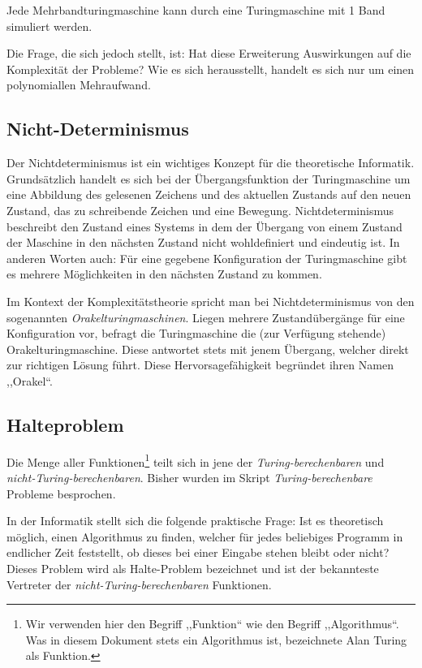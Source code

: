 Jede Mehrbandturingmaschine kann durch eine Turingmaschine mit 1 Band simuliert werden.

Die Frage, die sich jedoch stellt, ist: Hat diese Erweiterung Auswirkungen auf die Komplexität der Probleme? Wie es sich herausstellt, handelt es sich nur um einen polynomiallen Mehraufwand.
%
\subsection{Nicht-Determinismus}
\label{sec:nondeterminism}
%
Der Nichtdeterminismus ist ein wichtiges Konzept für die theoretische Informatik. Grundsätzlich handelt es sich bei der Übergangsfunktion der Turingmaschine um eine Abbildung des gelesenen Zeichens und des aktuellen Zustands auf den neuen Zustand, das zu schreibende Zeichen und eine Bewegung. Nichtdeterminismus beschreibt den Zustand eines Systems in dem der Übergang von einem Zustand der Maschine in den nächsten Zustand nicht wohldefiniert und eindeutig ist. In anderen Worten auch: Für eine gegebene Konfiguration der Turingmaschine gibt es mehrere Möglichkeiten in den nächsten Zustand zu kommen.

Im Kontext der Komplexitätstheorie spricht man bei Nichtdeterminismus von den sogenannten \emph{Orakelturingmaschinen}. Liegen mehrere Zustandübergänge für eine Konfiguration vor, befragt die Turingmaschine die (zur Verfügung stehende) Orakelturingmaschine. Diese antwortet stets mit jenem Übergang, welcher direkt zur richtigen Lösung führt. Diese Hervorsagefähigkeit begründet ihren Namen ,,Orakel``.
%
\subsection{Halteproblem}
%
 Die Menge aller Funktionen\footnote{Wir verwenden hier den Begriff ,,Funktion`` wie den Begriff ,,Algorithmus``. Was in diesem Dokument stets ein Algorithmus ist, bezeichnete Alan Turing als Funktion.} teilt sich  in jene der \emph{Turing-berechenbaren} und \emph{nicht-Turing-berechenbaren}. Bisher wurden im Skript \emph{Turing-berechenbare} Probleme besprochen.\newline

 In der Informatik stellt sich die folgende praktische Frage: Ist es theoretisch möglich, einen Algorithmus zu finden, welcher für jedes beliebiges Programm in endlicher Zeit feststellt, ob dieses bei einer Eingabe stehen bleibt oder nicht? Dieses Problem wird als Halte-Problem bezeichnet und ist der bekannteste Vertreter der \emph{nicht-Turing-berechenbaren} Funktionen.\newline

